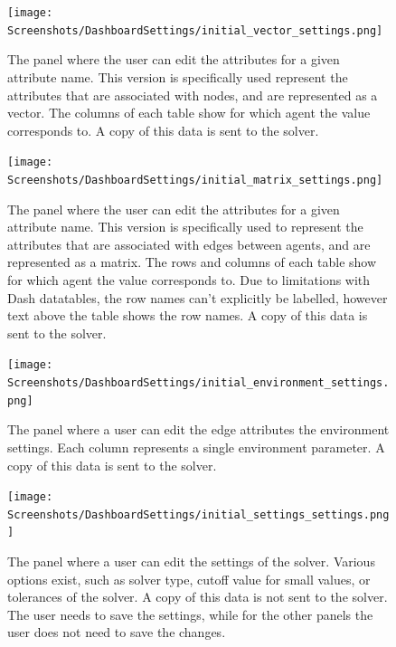 \begin{figure}
    \centering
    \texttt{[image: Screenshots/DashboardSettings/initial\_vector\_settings.png]}
    \caption{
        The panel where the user can edit the attributes for a given attribute name. 
        This version is specifically used represent the attributes that are associated with nodes, and are represented as a vector. 
        The columns of each table show for which agent the value corresponds to. 
        A copy of this data is sent to the solver.
    }
    \label{fig:ss:ds:vector}
\end{figure}
\begin{figure}
    \centering
    \texttt{[image: Screenshots/DashboardSettings/initial\_matrix\_settings.png]}
    \caption{
        The panel where the user can edit the attributes for a given attribute name. 
        This version is specifically used to represent the attributes that are associated with edges between agents, and are represented as a matrix. 
        The rows and columns of each table show for which agent the value corresponds to. 
        Due to limitations with Dash datatables, the row names can't explicitly be labelled, however text above the table shows the row names. 
        A copy of this data is sent to the solver. 
    }
    \label{fig:ss:ds:matrix}
\end{figure}
\begin{figure}
    \centering
    \texttt{[image: Screenshots/DashboardSettings/initial\_environment\_settings.png]}
    \caption{
        The panel where a user can edit the edge attributes the environment settings. 
        Each column represents a single environment parameter. 
        A copy of this data is sent to the solver.
    }
    \label{fig:ss:ds:environment}
\end{figure}
\begin{figure}
    \centering
    \texttt{[image: Screenshots/DashboardSettings/initial\_settings\_settings.png]}
    \caption{
        The panel where a user can edit the settings of the solver. 
        Various options exist, such as solver type, cutoff value for small values, or tolerances of the solver. 
        A copy of this data is not sent to the solver. 
        The user needs to save the settings, while for the other panels the user does not need to save the changes. 
    }
    \label{fig:ss:ds:settings}
\end{figure}

